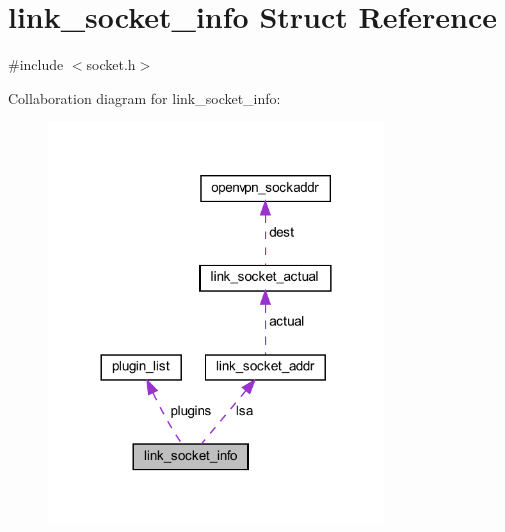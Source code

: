 \hypertarget{structlink__socket__info}{}\section{link\+\_\+socket\+\_\+info Struct Reference}
\label{structlink__socket__info}


{\ttfamily \#include $<$socket.\+h$>$}



Collaboration diagram for link\+\_\+socket\+\_\+info\+:
\nopagebreak
\begin{figure}[H]
\begin{center}
\leavevmode
\includegraphics[width=252pt]{structlink__socket__info__coll__graph}
\end{center}
\end{figure}
